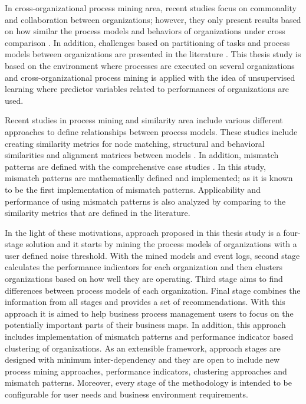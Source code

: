 In cross-organizational process mining area, recent studies focus on commonality and collaboration between organizations; however, they only present results based on how similar the process models and behaviors of organizations under cross comparison \cite{buijs2012towards}. In addition, challenges based on partitioning of tasks and process models between organizations are presented in the literature \cite{van2011intra}. This thesis study is based on the environment where processes are executed on several organizations and cross-organizational process mining is applied with the idea of unsupervised learning where predictor variables related to performances of organizations are used.

Recent studies in process mining and similarity area  include various different approaches to define relationships between process models. These studies include creating similarity metrics for node matching, structural and behavioral similarities \cite{dijkman2011similarity} and alignment matrices between models \cite{buijs2014comparing}. In addition, mismatch patterns are defined with the comprehensive case studies \cite{dijkman2007mismatch}. In this study, mismatch patterns are mathematically defined and implemented; as it is known to be the first implementation of mismatch patterns. Applicability and performance of using mismatch patterns is also analyzed by comparing to the similarity metrics that are defined in the literature. 

In the light of these motivations, approach proposed in this thesis study is a four-stage solution and it starts by mining the process models of organizations with a user defined noise threshold. With the mined models and event logs, second stage calculates the performance indicators for each organization and then clusters organizations based on how well they are operating. Third stage aims to find differences between process models of each organization. Final stage combines the information from all stages and provides a set of recommendations. With this approach it is aimed to help business process management users to focus on the potentially important parts of their business maps. In addition, this approach includes implementation of mismatch patterns and performance indicator based clustering of organizations. As an extensible framework, approach stages are designed with minimum inter-dependency and they are open to include new process mining approaches, performance indicators, clustering approaches and mismatch patterns. Moreover, every stage of the methodology is intended to be configurable for user needs and business environment requirements.

